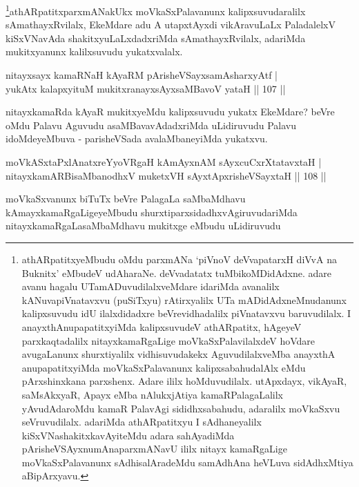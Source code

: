 \begin{artha}
\footnote{athARpatitxyeMbudu oMdu parxmANa `piVnoV deVvapatarxH diVvA na Buknitx' eMbudeV udAharaNe. deVvadatatx tuMbikoMDidAdxne. adare avanu hagalu UTamADuvudilalxveMdare idariMda avanalilx kANuvapiVnatavxvu (puSiTxyu) rAtirxyalilx UTa mADidAdxneMnudanunx kalipxsuvudu idU ilalxdidadxre beVrevidhadalilx piVnatavxvu baruvudilalx. I anayxthAnupapatitxyiMda kalipxsuvudeV athARpatitx, hAgeyeV parxkaqtadalilx nitayxkamaRgaLige moVkaSxPalavilalxdeV hoVdare avugaLanunx shurxtiyalilx vidhisuvudakekx AguvudilalxveMba anayxthA anupapatitxyiMda moVkaSxPalavanunx kalipxsabahudalAlx eMdu pArxshinxkana parxshenx. Adare ililx hoMduvudilalx. utApxdayx, vikAyaR, saMsAkxyaR, Apayx eMba nAlukxjAtiya kamaRPalagaLalilx yAvudAdaroMdu kamaR PalavAgi sididhxsabahudu, adaralilx moVkaSxvu seVruvudilalx. adariMda athARpatitxyu I sAdhaneyalilx kiSxVNashakitxkavAyiteMdu adara sahAyadiMda pArisheVSAyxnumAnaparxmANavU ililx nitayx kamaRgaLige moVkaSxPalavanunx sAdhisalAradeMdu samAdhAna heVLuva sidAdhxMtiya aBipArxyavu.}athARpatitxparxmANakUkx moVkaSxPalavanunx kalipxsuvudaralilx sAmathayxRvilalx, EkeMdare adu A utapxtAyxdi vikAravuLaLx PaladalelxV kiSxVNavAda shakitxyuLaLxdadxriMda sAmathayxRvilalx, adariMda mukitxyanunx kalilxsuvudu yukatxvalalx.
\end{artha}


\begin{shl}
nitayxsayx kamaRNaH kAyaRM pArisheVSayxsamAsharxyAtf |\\
yukAtx kalapxyituM mukitxranayxsAyxsaMBavoV yataH \hfill || 107 ||
\end{shl}

\begin{artha}
nitayxkamaRda kAyaR mukitxyeMdu kalipxsuvudu yukatx EkeMdare? beVre oMdu Palavu Aguvudu asaMBavavAdadxriMda uLidiruvudu Palavu idoMdeyeMbuva - parisheVSada avalaMbaneyiMda yukatxvu.
\end{artha}

\begin{shl}
moVkASxtaPxlAnatxreYyoVRgaH kAmAyxnAM sAyxcuCxrXtatavxtaH |\\
nitayxkamARBisaMbanodhxV muketxVH sAyxtApxrisheVSayxtaH \hfill || 108 ||
\end{shl}

\begin{artha}
moVkaSxvanunx biTuTx beVre PalagaLa saMbaMdhavu kAmayxkamaRgaLigeyeMbudu shurxtiparxsidadhxvAgiruvudariMda nitayxkamaRgaLasaMbaMdhavu mukitxge eMbudu  uLidiruvudu
\end{artha}

